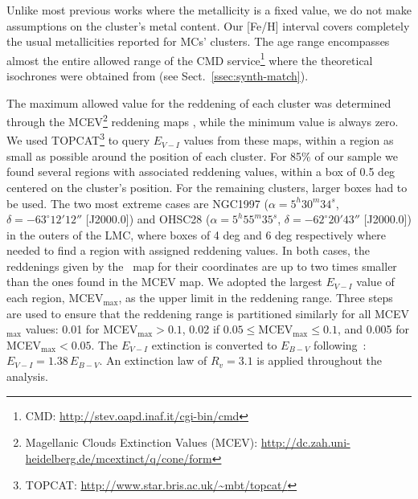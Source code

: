 \documentclass{aa}
\begin{document}
Unlike most previous works where the metallicity is a fixed value, we do not
make assumptions on the cluster's metal content. Our [Fe/H] interval covers
completely the usual metallicities reported for MCs' clusters.
The age range encompasses almost the entire allowed range of the CMD
service\footnote{CMD\@: \url{http://stev.oapd.inaf.it/cgi-bin/cmd}}
where the theoretical isochrones were obtained from (see
Sect.~\ref{ssec:synth-match}).

The maximum allowed value for the reddening of each cluster was determined
through the MCEV\footnote{Magellanic Clouds Extinction Values (MCEV):
\url{http://dc.zah.uni-heidelberg.de/mcextinct/q/cone/form}} reddening maps
\citep{Haschke_2011}, while the minimum value is always zero.
%
We used TOPCAT\footnote{TOPCAT\@: \url{http://www.star.bris.ac.uk/~mbt/topcat/}}
to query $E_{V-I}$ values from these maps, within a region as small as possible
around the position of each cluster.
For 85\% of our sample we found several regions with associated reddening
values, within a box of 0.5 deg centered on the cluster's position.
For the remaining clusters, larger boxes had to be used. The two most extreme
cases are NGC1997
($\alpha{=}5^h30^m34^s$, $\delta{=}-63^\circ12'12''$ [J2000.0]) and OHSC28
($\alpha{=}5^h55^m35^s$, $\delta{=}-62^\circ20'43''$ [J2000.0]) in the outers
of the LMC, where boxes of 4 deg and 6 deg respectively where needed to find a
region with assigned reddening values. In both cases, the reddenings given by
the~\cite{Schlafly_2011} map for their coordinates are up to two times smaller
than the ones found in the MCEV map.
%
We adopted the largest $E_{V-I}$ value of each region, MCEV$_{\max}$, as the
upper limit in the reddening range. Three steps are used to ensure that the
reddening range is partitioned similarly for all MCEV$_{\max}$ values: 0.01 for
MCEV$_{\max} {>}0.1$, 0.02 if $0.05{\leq}\mathrm{MCEV}_{\max}{\leq}0.1$, and
0.005 for MCEV$_{\max}{<}0.05$.
%
The $E_{V-I}$ extinction is converted to $E_{B-V}$
following~\cite{Tammann_2003}: $E_{V-I}{=}1.38\,E_{B-V}$. An extinction
law of $R_v{=}3.1$ is applied throughout the analysis.
\end{document}

